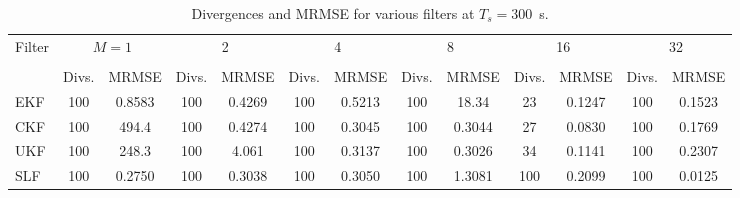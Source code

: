 \documentclass[../zhang_thesis.tex]{subfiles}
\begin{document}
\begin{sidewaystable}
\caption{Divergences and MRMSE for various filters at $T_s=300$~s.}
\centering
\begin{tabular}{l*{12}{c}}
\toprule
Filter & \multicolumn{2}{c}{$M=1$} & \multicolumn{2}{c}{2} & \multicolumn{2}{c}{4} & \multicolumn{2}{c}{8} & \multicolumn{2}{c}{16} & \multicolumn{2}{c}{32} \\
\cmidrule(r){2-3} \cmidrule(lr){4-5} \cmidrule(lr){6-7} \cmidrule(lr){8-9} \cmidrule(lr){10-11} \cmidrule(lr){12-13} \\
& Divs. & MRMSE & Divs. & MRMSE & Divs. & MRMSE & Divs. & MRMSE & Divs. & MRMSE & Divs. & MRMSE \\
\midrule
EKF & 100 & 0.8583 & 100 & 0.4269 & 100 & 0.5213 & 100 & 18.34  &  23 & 0.1247 & 100 & 0.1523 \\
CKF & 100 & 494.4  & 100 & 0.4274 & 100 & 0.3045 & 100 & 0.3044 &  27 & 0.0830 & 100 & 0.1769 \\
UKF & 100 & 248.3  & 100 & 4.061  & 100 & 0.3137 & 100 & 0.3026 &  34 & 0.1141 & 100 & 0.2307 \\
SLF & 100 & 0.2750 & 100 & 0.3038 & 100 & 0.3050 & 100 & 1.3081 & 100 & 0.2099 & 100 & 0.0125 \\
\bottomrule
\end{tabular}
\end{sidewaystable}
\end{document}
